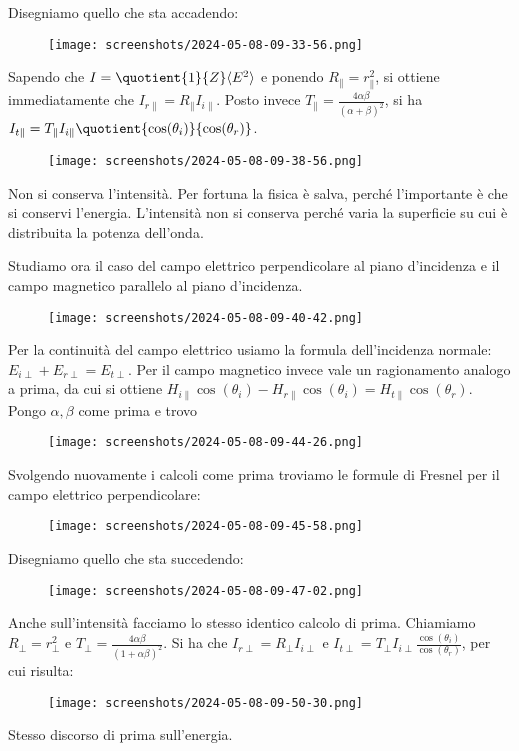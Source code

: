 Disegniamo quello che sta accadendo:
\begin{figure}[H]
	\centering
	\texttt{[image: screenshots/2024-05-08-09-33-56.png]}
\end{figure}
Sapendo che \(I= \quotient{1}{Z} \langle E ^{2}  \rangle \) e ponendo \(R_\parallel = r_\parallel ^{2} \), si ottiene immediatamente che \(I_{r \parallel} = R_\parallel I_{i \parallel}\). Posto invece \(T_\parallel = \frac{4 \alpha \beta }{(\alpha + \beta )^{2} }\), si ha \(I_{t \parallel} = T_\parallel I_{i \parallel} \quotient{\cos (\theta _i)}{\cos (\theta _r)} \).
\begin{figure}[H]
	\centering
	\texttt{[image: screenshots/2024-05-08-09-38-56.png]}
\end{figure}
Non si conserva l'intensità. Per fortuna la fisica è salva, perché l'importante è che si conservi l'energia. L'intensità non si conserva perché varia la superficie su cui è distribuita la potenza dell'onda.

Studiamo ora il caso del campo elettrico perpendicolare al piano d'incidenza e il campo magnetico parallelo al piano d'incidenza.
\begin{figure}[H]
	\centering
	\texttt{[image: screenshots/2024-05-08-09-40-42.png]}
\end{figure}
Per la continuità del campo elettrico usiamo la formula dell'incidenza normale: \(E_{i \perp } + E_{r \perp } = E_{t\perp } \). Per il campo magnetico invece vale un ragionamento analogo a prima, da cui si ottiene \(H_{i\parallel }\cos (\theta _i) - H_{r\parallel } \cos (\theta _i) = H_{t\parallel } \cos (\theta _r)   \). Pongo \(\alpha, \beta \) come prima e trovo
\begin{figure}[H]
	\centering
	\texttt{[image: screenshots/2024-05-08-09-44-26.png]}
\end{figure}
Svolgendo nuovamente i calcoli come prima troviamo le formule di Fresnel per il campo elettrico perpendicolare:
\begin{figure}[H]
	\centering
	\texttt{[image: screenshots/2024-05-08-09-45-58.png]}
\end{figure}
Disegniamo quello che sta succedendo:
\begin{figure}[H]
	\centering
	\texttt{[image: screenshots/2024-05-08-09-47-02.png]}
\end{figure}
Anche sull'intensità facciamo lo stesso identico calcolo di prima. Chiamiamo \(R_{\perp } = r_{\perp }^{2}   \) e \(T_{\perp } = \frac{4 \alpha \beta }{(1 + \alpha \beta )^{2} } \). Si ha che \(I_{r\perp } = R_{\perp }I_{i\perp }   \) e \(I_{t\perp }= T_{\perp }I_{i\perp } \frac{\cos (\theta _i)}{\cos (\theta_r)}  \), per cui risulta:
\begin{figure}[H]
	\centering
	\texttt{[image: screenshots/2024-05-08-09-50-30.png]}
\end{figure}
Stesso discorso di prima sull'energia.

